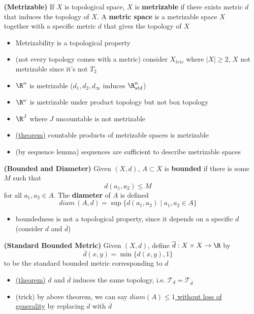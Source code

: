 \documentclass[10.5pt]{article}
\newcommand{\calT}{\mathcal{T}}
\begin{document}
\begin{defn*}
    \textbf{(Metrizable)} If $X$ is topological space, $X$ is \textbf{metrizable} if there exists metric $d$ that induces the topology of $X$. A \textbf{metric space} is a metrizable space $X$ together with a specific metric $d$ that gives the topology of $X$
    \begin{itemize}
        \item Metrizability is a topological property
        \item (not every topology comes with a metric) consider $X_{triv}$ where $|X|\geq 2$, $X$ not metrizable since it's not $T_2$
        \item $\R^n$ is metrizable ($d_1,d_2,d_{\infty}$ induces $\R^n_{std}$)
        \item $\R^{\omega}$ is metrizable under product topology but not box topology
        \item $\R^J$ where $J$ uncountable is not metrizable
        \item \underline{(theorem)} countable products of metrizable spaces is metrizable
        \item (by sequence lemma) sequences are sufficient to describe metrizable spaces
    \end{itemize}
\end{defn*}


\begin{defn*}
    \textbf{(Bounded and Diameter)} Given $(X,d)$, $A\subset X$ is \textbf{bounded} if there is some $M$ such that
    \[
        d(a_1,a_2) \leq M    
    \]
    for all $a_1,a_2\in A$. The \textbf{diameter} of $A$ is defined
    \[
        diam\, (A, d) = \sup\{d(a_1,a_2) \mid a_1,a_2\in A\}    
    \]
    \begin{itemize}
        \item boundedness is not a topological property, since it depends on a specific $d$ (consider $d$ and $\overline{d}$)
    \end{itemize}
\end{defn*}

\begin{defn*}
    \textbf{(Standard Bounded Metric)} Given $(X,d)$, define $\overline{d}: X\times X\to \R$ by 
    \[
        \overline{d}(x,y) = \min \{ d(x,y), 1\}    
    \]
    to be the standard bounded metric corresponding to $d$
    \begin{itemize}
        \item \underline{(theorem)} $d$ and $\overline{d}$ induces the same topology, i.e. $\calT_{d} = \calT_{\overline{d}}$
        \item (trick) by above theorem, we can say \underline{$diam(A) \leq 1$ without loss of generality} by replacing $d$ with $\overline{d}$
    \end{itemize}
\end{defn*}
\end{document}
